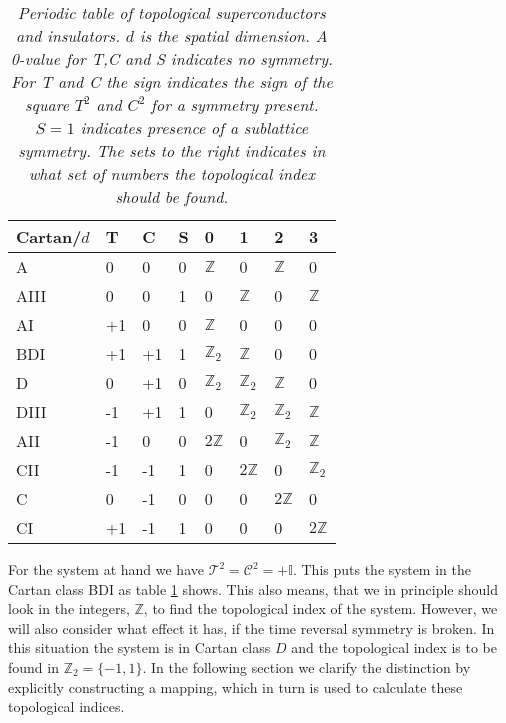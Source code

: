 \begin{table}[htb]
\centering
\caption{\textit{Periodic table of topological superconductors and insulators. $d$ is the spatial dimension. A 0-value for T,C and S indicates no symmetry. For T and C the sign indicates the sign of the square $T^2$ and $C^2$ for a symmetry present. $S=1$ indicates presence of a sublattice symmetry. The sets to the right indicates in what set of numbers the topological index should be found. }}
\begin{tabular}{|l|l l l|l l l l|}
\hline Cartan/$d$   &  T &  C & S					& 0 & 1 & 2 & 3 \\
\hline A    		&  0 &  0 & 0					& $\mathbb{Z}$ & 0 & $\mathbb{Z}$ & 0   			 \\
\hline AIII 		&  0 &  0 & 1					& 0 & $\mathbb{Z}$ & 0 & $\mathbb{Z}$   			 \\
\hline AI   		& +1 &  0 & 0					& $\mathbb{Z}$ & 0 & 0 & 0 			    			 \\
\hline BDI	       	& +1 & +1 & 1 					& $\mathbb{Z}_2$ & $\mathbb{Z}$ & 0 & 0 			 \\
\hline D	       	&  0 & +1 & 0 					& $\mathbb{Z}_2$ & $\mathbb{Z}_2$ & $\mathbb{Z}$ & 0 \\
\hline DIII	       	& -1 & +1 & 1 					& 0 & $\mathbb{Z}_2$ & $\mathbb{Z}_2$ & $\mathbb{Z}$ \\
\hline AII	       	& -1 &  0 & 0 				 	& $2\mathbb{Z}$ & 0 & $\mathbb{Z}_2$ & $\mathbb{Z}$  \\
\hline CII	       	& -1 & -1 & 1 					& 0 & $2\mathbb{Z}$ & 0 & $\mathbb{Z}_2$  			 \\
\hline C	       	&  0 & -1 & 0 					& 0 & 0 & $2\mathbb{Z}$ & 0  						 \\
\hline CI	       	& +1 & -1 & 1 					& 0 & 0 & 0 & $2\mathbb{Z}$  						 \\
\hline 
\end{tabular}
\label{tab.PeriodicTableTISC}
\end{table}

For the system at hand we have $\mathcal{T}^2 = \mathcal{C}^2 = + \mathbb{I}$. This puts the system in the Cartan class BDI as table \ref{tab.PeriodicTableTISC} shows. This also means, that we in principle should look in the integers, $\mathbb{Z}$, to find the topological index of the system. However, we will also consider what effect it has, if the time reversal symmetry is broken. In this situation the system is in Cartan class $D$ and the topological index is to be found in $\mathbb{Z}_2 = \{-1,1\}$. In the following section we clarify the distinction by explicitly constructing a mapping, which in turn is used to calculate these topological indices. 

